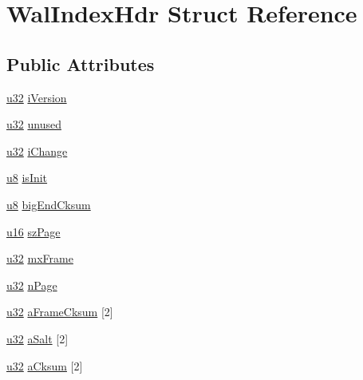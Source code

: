 \hypertarget{struct_wal_index_hdr}{\section{Wal\-Index\-Hdr Struct Reference}
\label{struct_wal_index_hdr}
}
\subsection*{Public Attributes}
\begin{DoxyCompactItemize}
\item 
\hyperlink{sqlite3_8c_a03ad5adfaeb9b7640dde78a0cc390319}{u32} \hyperlink{struct_wal_index_hdr_a49295f5eb9d6f37a1498cf1a66410b92}{i\-Version}
\item 
\hyperlink{sqlite3_8c_a03ad5adfaeb9b7640dde78a0cc390319}{u32} \hyperlink{struct_wal_index_hdr_aa00596b4ad38dce7f97261a49ce64d74}{unused}
\item 
\hyperlink{sqlite3_8c_a03ad5adfaeb9b7640dde78a0cc390319}{u32} \hyperlink{struct_wal_index_hdr_a9fafc4d4af9ab741b3b8733380a7927f}{i\-Change}
\item 
\hyperlink{sqlite3_8c_a74a0f6424ae628af25f23f0a35f6ead3}{u8} \hyperlink{struct_wal_index_hdr_a1cc0dc2be6cd108a7bcca260be3e4cb9}{is\-Init}
\item 
\hyperlink{sqlite3_8c_a74a0f6424ae628af25f23f0a35f6ead3}{u8} \hyperlink{struct_wal_index_hdr_aa6be53a6a60ea0b2a97a245b5ca68d61}{big\-End\-Cksum}
\item 
\hyperlink{sqlite3_8c_a20f2299e322dcbde37cb07b16910b843}{u16} \hyperlink{struct_wal_index_hdr_a74e9182803402942cf6e45d8e23589c7}{sz\-Page}
\item 
\hyperlink{sqlite3_8c_a03ad5adfaeb9b7640dde78a0cc390319}{u32} \hyperlink{struct_wal_index_hdr_aa697dbe8134daf3d02dce07feb897f41}{mx\-Frame}
\item 
\hyperlink{sqlite3_8c_a03ad5adfaeb9b7640dde78a0cc390319}{u32} \hyperlink{struct_wal_index_hdr_ae4ca33947cd629feb9dce2b1f976c364}{n\-Page}
\item 
\hyperlink{sqlite3_8c_a03ad5adfaeb9b7640dde78a0cc390319}{u32} \hyperlink{struct_wal_index_hdr_a425dff294e0f0b30b6819c273404c721}{a\-Frame\-Cksum} \mbox{[}2\mbox{]}
\item 
\hyperlink{sqlite3_8c_a03ad5adfaeb9b7640dde78a0cc390319}{u32} \hyperlink{struct_wal_index_hdr_af99b92f673fd7ba1e4e4f9feb955453f}{a\-Salt} \mbox{[}2\mbox{]}
\item 
\hyperlink{sqlite3_8c_a03ad5adfaeb9b7640dde78a0cc390319}{u32} \hyperlink{struct_wal_index_hdr_aa202339b02766d088717bfce9e3a9c0e}{a\-Cksum} \mbox{[}2\mbox{]}
\end{DoxyCompactItemize}


